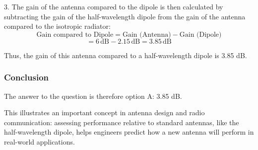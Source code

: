 3. The gain of the antenna compared to the dipole is then calculated by subtracting the gain of the half-wavelength dipole from the gain of the antenna compared to the isotropic radiator:
   \[
   \text{Gain compared to Dipole} = \text{Gain (Antenna)} - \text{Gain (Dipole)} 
   \]
   \[
   = 6 \, \text{dB} - 2.15 \, \text{dB} = 3.85 \, \text{dB}
   \]

Thus, the gain of this antenna compared to a half-wavelength dipole is 3.85 dB.

\subsubsection{Conclusion}

The answer to the question is therefore option A: 3.85 dB. 

This illustrates an important concept in antenna design and radio communication: assessing performance relative to standard antennas, like the half-wavelength dipole, helps engineers predict how a new antenna will perform in real-world applications. 

